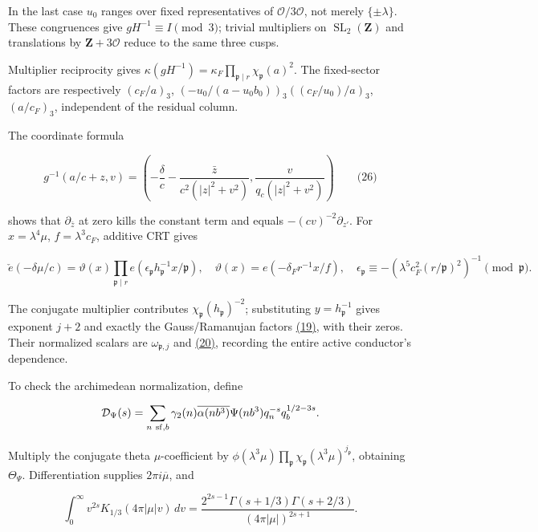 In the last case \(u_0\) ranges over fixed representatives of \(\mathcal O/3\mathcal O\), not merely \(\{\pm\lambda\}\). These congruences give \(gH^{-1}\equiv I\pmod3\); trivial multipliers on \(\operatorname{SL}_2(\mathbf Z)\) and translations by \(\mathbf Z+3\mathcal O\) reduce to the same three cusps.

Multiplier reciprocity gives \(\kappa(gH^{-1})=\kappa_F\prod_{\mathfrak p\mid r}\chi_{\mathfrak p}(a)^2\). The fixed-sector factors are respectively \((c_F/a)_3\), \((-u_0/(a-u_0b_0))_3((c_F/u_0)/a)_3\), \((a/c_F)_3\), independent of the residual column.

The coordinate formula

\hypertarget{cf:eq:B.10}{}

\label{cf:eq:B.10}

\[
g^{-1}(a/c+z,v)=
\left(-\frac\delta c-\frac{\bar z}{c^2(|z|^2+v^2)},
\frac v{q_c(|z|^2+v^2)}\right)
\qquad\text{(26)}
\]

shows that \(\partial_{\bar z}\) at zero kills the constant term and equals \(-(cv)^{-2}\partial_{z'}\). For \(x=\lambda^4\mu\), \(f=\lambda^3c_F\), additive CRT gives

\[
\check e(-\delta\mu/c)=\vartheta(x)
\prod_{\mathfrak p\mid r}e(\epsilon_{\mathfrak p}h_{\mathfrak p}^{-1}x/\mathfrak p),
\quad \vartheta(x)=e(-\delta_Fr^{-1}x/f),
\quad\epsilon_{\mathfrak p}\equiv-(\lambda^5c_F^2(r/\mathfrak p)^2)^{-1}\pmod{\mathfrak p}.
\]

The conjugate multiplier contributes \(\chi_{\mathfrak p}(h_{\mathfrak p})^{-2}\); substituting \(y=h_{\mathfrak p}^{-1}\) gives exponent \(j+2\) and exactly the Gauss/Ramanujan factors \protect\hyperlink{cf:eq:B.3}{(19)}, with their zeros. Their normalized scalars are \(\omega_{\mathfrak p,j}\) and \protect\hyperlink{cf:eq:B.4}{(20)}, recording the entire active conductor's dependence.

To check the archimedean normalization, define

\[
\mathcal D_\Psi(s)=\sum_{n\ {\rm sf},b}\gamma_2(n)\overline{\alpha(nb^3)}\Psi(nb^3)q_n^{-s}q_b^{1/2-3s}.
\]

Multiply the conjugate theta \(\mu\)-coefficient by \(\phi(\lambda^3\mu)\prod_{\mathfrak p}\chi_{\mathfrak p}(\lambda^3\mu)^{j_{\mathfrak p}}\), obtaining \(\Theta_\Psi\). Differentiation supplies \(2\pi i\overline\mu\), and

\[
\int_0^\infty v^{2s}K_{1/3}(4\pi|\mu|v)\,dv
=\frac{2^{2s-1}\Gamma(s+1/3)\Gamma(s+2/3)}{(4\pi|\mu|)^{2s+1}}.
\]

